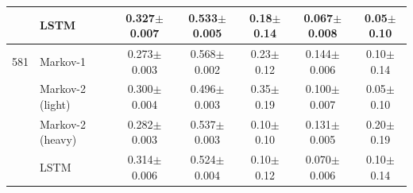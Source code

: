 \begin{table}[!t]
\begin{tabular}{llccccc}
 & LSTM & 0.327$\pm$0.007 & 0.533$\pm$0.005 & 0.18$\pm$0.14 & 0.067$\pm$0.008 & 0.05$\pm$0.10 \\
\midrule
581 & Markov-1 & 0.273$\pm$0.003 & 0.568$\pm$0.002 & 0.23$\pm$0.12 & 0.144$\pm$0.006 & 0.10$\pm$0.14 \\
 & Markov-2 (light) & 0.300$\pm$0.004 & 0.496$\pm$0.003 & 0.35$\pm$0.19 & 0.100$\pm$0.007 & 0.05$\pm$0.10 \\
 & Markov-2 (heavy) & 0.282$\pm$0.003 & 0.537$\pm$0.003 & 0.10$\pm$0.10 & 0.131$\pm$0.005 & 0.20$\pm$0.19 \\
 & LSTM & 0.314$\pm$0.006 & 0.524$\pm$0.004 & 0.10$\pm$0.12 & 0.070$\pm$0.006 & 0.10$\pm$0.14 \\
\bottomrule
\end{tabular}
\end{table}

